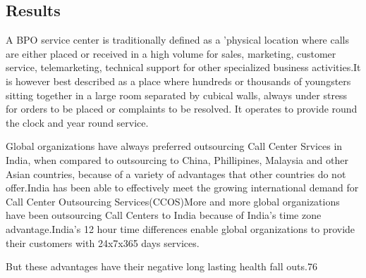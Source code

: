 

\subsection{Results}

A BPO service center is traditionally defined as a 'physical location where calls are either placed or received in a high volume for sales, marketing, customer service, telemarketing, technical support for other specialized business activities.It is however best described as a place where hundreds or thousands of youngsters sitting together in a large room separated by cubical walls, always under stress for orders to be placed or complaints to be resolved. It operates to provide round the clock and year round service.

Global organizations have always preferred outsourcing Call Center Srvices in India, when compared to outsourcing to China, Phillipines, Malaysia and other Asian countries, because of a variety of advantages that other countries do not offer.India has been able to effectively meet the growing international demand for Call Center Outsourcing Services(CCOS)More and more global organizations have been outsourcing Call Centers to India because of India's time zone advantage.India's 12 hour time differences enable global organizations to provide their customers with 24x7x365 days services.

But these advantages have their negative long lasting health fall outs.76%

